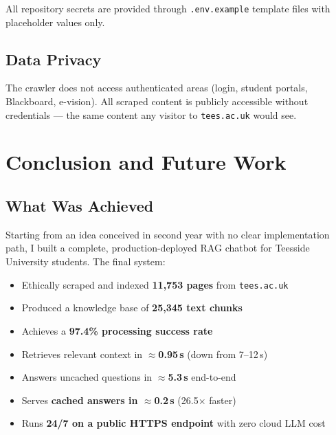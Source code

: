 \documentclass[12pt,a4paper]{report}
\begin{document}
All repository secrets are provided through \texttt{.env.example} template files with placeholder values only.

\section{Data Privacy}

The crawler does not access authenticated areas (login, student portals, Blackboard, e-vision). All scraped content is publicly accessible without credentials --- the same content any visitor to \texttt{tees.ac.uk} would see.

\chapter{Conclusion and Future Work}

\section{What Was Achieved}

Starting from an idea conceived in second year with no clear implementation path, I built a complete, production-deployed RAG chatbot for Teesside University students. The final system:

\begin{itemize}
    \item Ethically scraped and indexed \textbf{11,753 pages} from \texttt{tees.ac.uk}
    \item Produced a knowledge base of \textbf{25,345 text chunks}
    \item Achieves a \textbf{97.4\% processing success rate}
    \item Retrieves relevant context in \textbf{$\approx$0.95\,s} (down from 7--12\,s)
    \item Answers uncached questions in \textbf{$\approx$5.3\,s} end-to-end
    \item Serves \textbf{cached answers in $\approx$0.2\,s} (26.5$\times$ faster)
    \item Runs \textbf{24/7 on a public HTTPS endpoint} with zero cloud LLM cost
\end{itemize}
\end{document}
